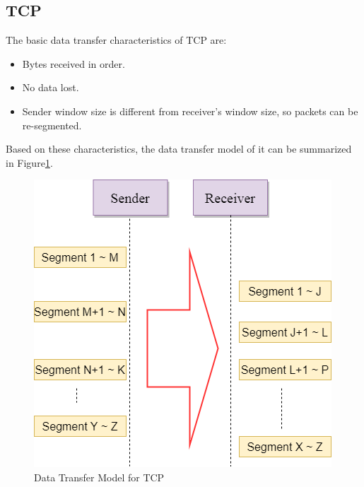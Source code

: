 \subsection{TCP}
The basic data transfer characteristics of TCP are:
\begin{itemize}
  \item Bytes received in order.
  \item No data lost.
  \item Sender window size is different from receiver's window size, so packets can be re-segmented.
\end{itemize}
Based on these characteristics, the data transfer model of it can be summarized in Figure\ref{tcp}.
\begin{figure}[H]
\centerline{\includegraphics[scale=0.48]{Figures/tcp}}
 \caption{Data Transfer Model for TCP}
\label{tcp}
\end{figure}

